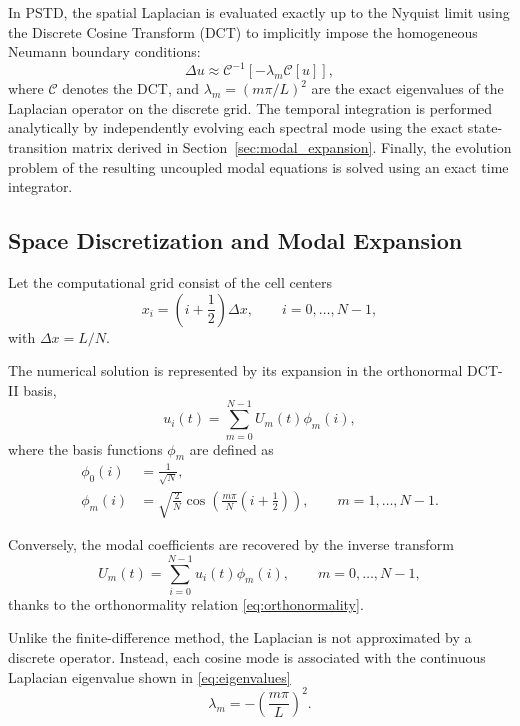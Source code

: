 \documentclass{Configuration_Files/PoliMi3i_thesis}
\begin{document}
In PSTD, the spatial Laplacian is evaluated exactly up to the Nyquist limit using the Discrete Cosine Transform (DCT) to implicitly impose the homogeneous Neumann boundary conditions:
\begin{equation}
    \Delta u \approx \mathcal{C}^{-1} \left[ -\lambda_m \mathcal{C}[u] \right],
\end{equation}
where $\mathcal{C}$ denotes the DCT, and $\lambda_m = (m\pi/L)^2$ are the exact eigenvalues of the Laplacian operator on the discrete grid. The temporal integration is performed analytically by independently evolving each spectral mode using the exact state-transition matrix derived in Section~\ref{sec:modal_expansion}. Finally, the evolution problem of the resulting uncoupled modal equations is solved using an exact time integrator.

\subsection{Space Discretization and Modal Expansion}
Let the computational grid consist of the cell centers
\begin{equation*}
x_i
=
\left(i+\frac12\right)\Delta x,
\qquad
i=0,\ldots,N-1,
\end{equation*}
with $\Delta x=L/N$.

The numerical solution is represented by its expansion in the orthonormal DCT-II basis,
\begin{equation*}
u_i(t)
=
\sum_{m=0}^{N-1}
U_m(t)\phi_m(i),
\end{equation*}
where the basis functions $\phi_m$ are defined as
\begin{align*}
\phi_0(i)
&=
\frac1{\sqrt N},
\\
\phi_m(i)
&=
\sqrt{\frac2N}
\cos\!\left(
\frac{m\pi}{N}
\left(i+\frac12\right)
\right),
\qquad
m=1,\ldots,N-1.
\end{align*}

Conversely, the modal coefficients are recovered by the inverse transform
\begin{equation*}
U_m(t)
=
\sum_{i=0}^{N-1}
u_i(t)\phi_m(i),
\qquad
m=0,\ldots,N-1,
\end{equation*}
thanks to the orthonormality relation \eqref{eq:orthonormality}.

Unlike the finite-difference method, the Laplacian is not approximated by a discrete operator. Instead, each cosine mode is associated with the continuous Laplacian eigenvalue shown in \eqref{eq:eigenvalues}
\begin{equation*}
\lambda_m
=
-\left(\frac{m\pi}{L}\right)^2.
\end{equation*}
\end{document}
